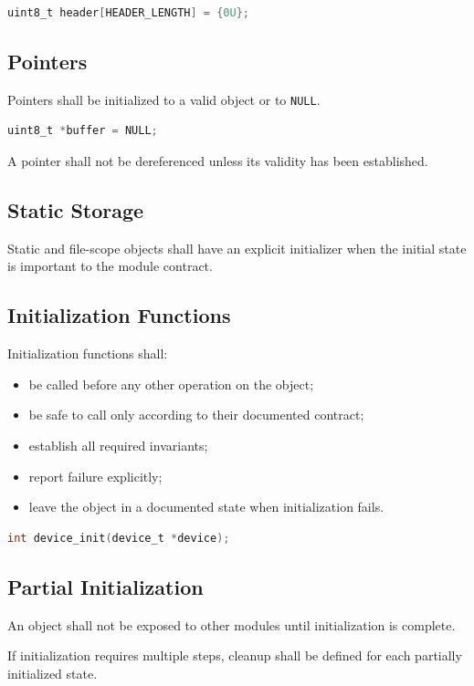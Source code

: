 \begin{lstlisting}[language=C]
uint8_t header[HEADER_LENGTH] = {0U};
\end{lstlisting}

\subsection{Pointers}

Pointers shall be initialized to a valid object or to \texttt{NULL}.

\begin{lstlisting}[language=C]
uint8_t *buffer = NULL;
\end{lstlisting}

A pointer shall not be dereferenced unless its validity has been established.

\subsection{Static Storage}

Static and file-scope objects shall have an explicit initializer when the initial state is important to the module contract.

\subsection{Initialization Functions}

Initialization functions shall:

\begin{itemize}
	\item be called before any other operation on the object;
	\item be safe to call only according to their documented contract;
	\item establish all required invariants;
	\item report failure explicitly;
	\item leave the object in a documented state when initialization fails.
\end{itemize}

\begin{lstlisting}[language=C]
int device_init(device_t *device);
\end{lstlisting}

\subsection{Partial Initialization}

An object shall not be exposed to other modules until initialization is complete.

If initialization requires multiple steps, cleanup shall be defined for each partially initialized state.

